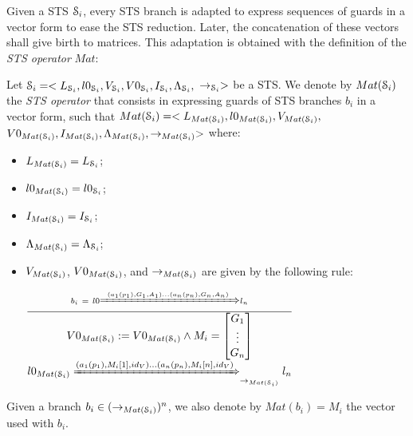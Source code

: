 Given a STS $\EuScript{S}_i$, every STS branch is adapted to
express sequences of guards in a vector form to ease the STS
reduction. Later, the concatenation of these vectors shall give
birth to matrices. This adaptation is obtained with the
definition of the \emph{STS operator} $Mat$:

\begin{definition}
\label{rule:matrix}
  Let $\EuScript{S}_i=<L_{\EuScript{S}_i},l0_{\EuScript{S}_i},V_{\EuScript{S}_i},V0_{\EuScript{S}_i},I_{\EuScript{S}_i},\Lambda_{\EuScript{S}_i},$
  $\rightarrow_{\EuScript{S}_i}>$ be a STS. We denote by
  $Mat(\EuScript{S}_i)$ the \emph{STS operator} that consists in
  expressing guards of STS branches $b_i$ in a vector form, such
  that
  $Mat(\EuScript{S}_i)=<L_{Mat(\EuScript{S}_i)},l0_{Mat(\EuScript{S}_i)},V_{Mat(\EuScript{S}_i)},$
  $V0_{Mat(\EuScript{S}_i)},I_{Mat(\EuScript{S}_i)},\Lambda_{Mat(\EuScript{S}_i)},\rightarrow_{Mat(\EuScript{S}_i)}>$
  where:

	\begin{itemize}
    \item $L_{Mat(\EuScript{S}_i)}=L_{\EuScript{S}_i}$;

    \item $l0_{Mat(\EuScript{S}_i)}=l0_{\EuScript{S}_i}$;

    \item $I_{Mat(\EuScript{S}_i)}=I_{\EuScript{S}_i}$;

    \item $\Lambda_{Mat(\EuScript{S}_i)} = \Lambda_{\EuScript{S}_i}$;

    \item $V_{Mat(\EuScript{S}_i)}$, $V0_{Mat(\EuScript{S}_i)}$,
      and $\rightarrow_{Mat(\EuScript{S}_i)}$ are given by the
      following rule:

    \begin{center}
    {\Large
    $\frac{b_i~= ~l0 \xRightarrow{(a_1(p_1),G_1,A_1) \dots
    (a_n(p_n),G_n,A_n)} l_n}{
      \begin{matrix}
        V0_{Mat(\EuScript{S}_i)}:=V0_{Mat(\EuScript{S}_i)} \wedge
        M_i=\begin{bmatrix}G_1\\ \vdots\\ G_n\end{bmatrix}\\
        l0_{Mat(\EuScript{S}_i)}
        \xRightarrow{(a_1(p_1),M_i[1],id_V) \dots (a_n(p_n),M_i[n],id_V) }_{\rightarrow_{Mat(\EuScript{S}_i)}} l_n\\
      \end{matrix}
    }$
    }
    \end{center}
  \end{itemize}

  Given a branch $b_i \in (\rightarrow_{Mat(\EuScript{S}_i)})^n$,
  we also denote by $Mat(b_i) = M_i$ the vector used with $b_i$.
\end{definition}

